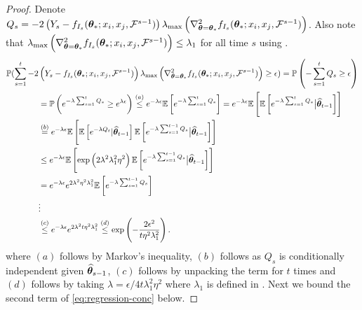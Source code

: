 \begin{proof}
Denote $Q_s = -2\left(Y_s - f_{I_s}(\bm{\theta}_*; x_i, x_j, \mathcal{F}^{s-1})\right)\lambda_{\max}\left(\nabla^2_{\bm{\theta}=\bm{\theta}_*}f_{I_s}(\bm{\theta}_*; x_i, x_j, \mathcal{F}^{s-1})\right)$. Also note that $\lambda_{\max}\left(\nabla^2_{\bm{\theta}=\bm{\theta}_*}f_{I_s}(\bm{\theta}_*; x_i, x_j, \mathcal{F}^{s-1})\right) \leq \lambda_1$ for all time $s$ using .
\begin{align*} 
\mathbb{P}(\sum_{s=1}^t-2&\left(Y_s - f_{I_s}(\bm{\theta}_*; x_i, x_j, \mathcal{F}^{s-1})\right)\lambda_{\max}\left(\nabla^2_{\bm{\theta}=\bm{\theta}_*}f_{I_s}(\bm{\theta}_*; x_i, x_j, \mathcal{F}^{s-1})\right) \geq  \epsilon) =\mathbb{P}\left(-\sum_{s=1}^{t} Q_{s} \geq \epsilon\right) \\
&=\mathbb{P}\left(e^{-\lambda \sum_{s=1}^{t} Q_{s}} \geq e^{\lambda \epsilon}\right) \overset{(a)}{\leq} e^{-\lambda \epsilon} \mathbb{E}\left[e^{-\lambda \sum_{s=1}^{t} Q_{s}}\right] 
=  e^{-\lambda \epsilon} \mathbb{E}\left[\mathbb{E}\left[e^{-\lambda \sum_{s=1}^{t} Q_{s}}\big|{\widehat{\bm{\theta}}}_{t-1}\right] \right]\\
&\overset{(b)}{=} e^{-\lambda \epsilon} \mathbb{E}\left[\mathbb{E}\left[e^{-\lambda  Q_{t}}|{\widehat{\bm{\theta}}}_{t-1}\right]\mathbb{E}\left[e^{-\lambda \sum_{s=1}^{t-1} Q_{s}} \big|{\widehat{\bm{\theta}}}_{t-1}\right]  \right]\\
&\leq e^{-\lambda \epsilon} \mathbb{E}\left[\exp\left(2\lambda^2\lambda_1^2\eta^2\right)\mathbb{E}\left[e^{-\lambda \sum_{s=1}^{t-1} Q_{s}}\big |{\widehat{\bm{\theta}}}_{t-1}\right]  \right]\\
& \overset{}{=} e^{-\lambda \epsilon} e^{2\lambda^{2} \eta^{2}\lambda_1^2} \mathbb{E}\left[e^{-\lambda \sum_{s=1}^{t-1} Q_{s}}\right] \\ 
& \vdots \\ 
& \overset{(c)}{\leq} e^{-\lambda \epsilon} e^{2\lambda^{2} t \eta^{2}\lambda^2_1} 
\overset{(d)}{\leq} \exp\left(-\dfrac{2\epsilon^2}{t\eta^2\lambda_1^2}\right).
\end{align*}
where $(a)$ follows by Markov's inequality, $(b)$ follows as $Q_s$ is conditionally independent given ${\widehat{\bm{\theta}}}_{s-1}$, $(c)$ follows by unpacking the term for $t$ times and $(d)$  follows by taking $\lambda= \epsilon / 4t\lambda_1^2\eta^2$ where $\lambda_1$ is defined in . Next we bound the second term of \eqref{eq:regression-conc} below.



\end{proof}
